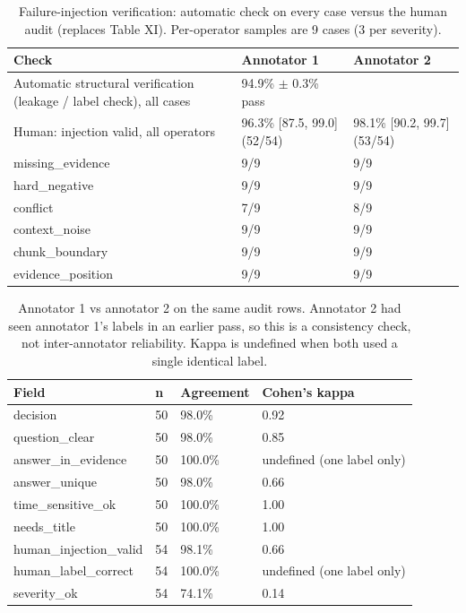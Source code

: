 \begin{table}[t]
\centering
\caption{Failure-injection verification: automatic check on every case versus the human audit (replaces Table XI). Per-operator samples are 9 cases (3 per severity).}
\small
\begin{tabular}{p{}ll}
\toprule
Check & Annotator 1 & Annotator 2 \\
\midrule
Automatic structural verification (leakage / label check), all cases & 94.9\% $\pm$ 0.3\% pass &  \\
Human: injection valid, all operators & 96.3\% {[}87.5, 99.0{]} (52/54) & 98.1\% {[}90.2, 99.7{]} (53/54) \\
  missing\_evidence & 9/9 & 9/9 \\
  hard\_negative & 9/9 & 9/9 \\
  conflict & 7/9 & 8/9 \\
  context\_noise & 9/9 & 9/9 \\
  chunk\_boundary & 9/9 & 9/9 \\
  evidence\_position & 9/9 & 9/9 \\
\bottomrule
\end{tabular}
\end{table}

\begin{table}[t]
\centering
\caption{Annotator 1 vs annotator 2 on the same audit rows. Annotator 2 had seen annotator 1's labels in an earlier pass, so this is a consistency check, not inter-annotator reliability. Kappa is undefined when both used a single identical label.}
\small
\begin{tabular}{llll}
\toprule
Field & n & Agreement & Cohen's kappa \\
\midrule
decision & 50 & 98.0\% & 0.92 \\
question\_clear & 50 & 98.0\% & 0.85 \\
answer\_in\_evidence & 50 & 100.0\% & undefined (one label only) \\
answer\_unique & 50 & 98.0\% & 0.66 \\
time\_sensitive\_ok & 50 & 100.0\% & 1.00 \\
needs\_title & 50 & 100.0\% & 1.00 \\
human\_injection\_valid & 54 & 98.1\% & 0.66 \\
human\_label\_correct & 54 & 100.0\% & undefined (one label only) \\
severity\_ok & 54 & 74.1\% & 0.14 \\
\bottomrule
\end{tabular}
\end{table}
